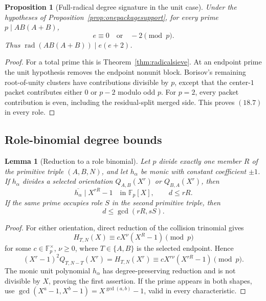 \documentclass[11pt]{article}
\newtheorem{proposition}[theorem]{Proposition}
\newtheorem{lemma}[theorem]{Lemma}
\theoremstyle{definition}
\begin{document}
\begin{proposition}[Full-radical degree signature in the unit case]
\label{prop:unitfullradical}
Under the hypotheses of Proposition~\ref{prop:onepackagesupport}, for every
prime \(p\mid AB(A+B)\),
\begin{equation}
 e\equiv0\quad\text{or}\quad-2\pmod p.
 \tag{18.7}
\end{equation}
Thus \(\operatorname{rad}(AB(A+B))\mid e(e+2)\).
\end{proposition}

\begin{proof}
For a total prime this is Theorem~\ref{thm:radicalsieve}.  At an endpoint
prime the unit hypothesis removes the endpoint nonunit block.  Borisov's
remaining root-of-unity clusters have contributions divisible by \(p\),
except that the center-\(1\) packet contributes either \(0\) or \(p-2\)
modulo odd \(p\).  For \(p=2\), every packet contribution is even, including
the residual-split merged side.  This proves \((18.7)\) in every role.
\end{proof}

\subsection{Role-binomial degree bounds}

\begin{lemma}[Reduction to a role binomial]
\label{lem:rolebinomial}
Let \(p\) divide exactly one member \(R\) of the primitive triple
\((A,B,N)\), and let \(h_\alpha\) be monic with constant coefficient
\(\pm1\).  If \(h_\alpha\) divides a selected orientation
\(Q_{A,B}(X^r)\) or \(Q_{B,A}(X^r)\), then
\begin{equation}
 \overline{h_\alpha}\mid X^{rR}-1
 \quad\text{in }\mathbb F_p[X],
 \qquad d\leq rR.
 \tag{18.8}
\end{equation}
If the same prime occupies role \(S\) in the second primitive triple, then
\[
 d\leq\gcd(rR,sS).
\]
\end{lemma}

\begin{proof}
For either orientation, direct reduction of the collision trinomial gives
\[
 H_{T,N}(X)\equiv cX^\nu(X^R-1)\pmod p
\]
for some \(c\in\mathbb F_p^\times\), \(\nu\geq0\), where
\(T\in\{A,B\}\) is the selected endpoint.  Hence
\[
 (X^r-1)^2Q_{T,N-T}(X^r)=H_{T,N}(X^r)
 \equiv cX^{r\nu}(X^{rR}-1)\pmod p.
\]
The monic unit polynomial \(h_\alpha\) has degree-preserving reduction and is
not divisible by \(X\), proving the first assertion.  If the prime appears in
both shapes, use
\(\gcd(X^a-1,X^b-1)=X^{\gcd(a,b)}-1\), valid in every characteristic.
\end{proof}
\end{document}
